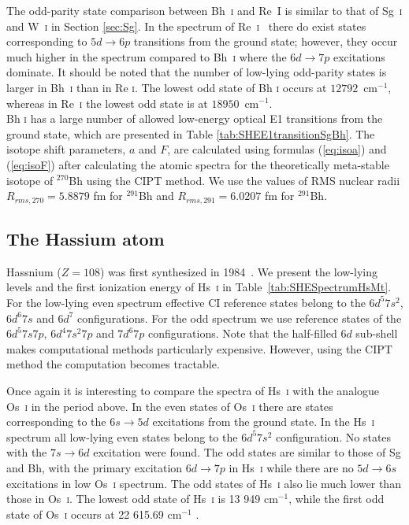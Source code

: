 \documentclass[8pt,a4paper, twoside]{report}
\begin{document}
 The odd-parity state comparison between Bh~\textsc{i} and Re~\textsc{I} is similar to that of Sg~\textsc{i} and W~\textsc{i} in Section \ref{sec:Sg}. In the spectrum of Re~\textsc{i}~\cite{NIST_ASD} there do exist states corresponding to  $5d \rightarrow 6p$ transitions from the ground state; however, they occur much higher in the spectrum compared to Bh~\textsc{i} where the $6d \rightarrow 7p$ excitations dominate. It should be noted that the number of low-lying odd-parity states is larger in Bh~\textsc{i} than in Re \textsc{i}. The lowest odd state of Bh \textsc{i} occurs at $12 792$~cm$^{-1}$, whereas in Re~\textsc{i} the lowest odd state is at $18 950$~cm$^{-1}$.\\
 \linebreak
 Bh \textsc{i} has a large number of allowed low-energy optical E1 transitions from the ground state, which are presented  in Table \ref{tab:SHEE1transitionSgBh}. The isotope shift parameters, $a$ and $F$, are calculated using formulas (\ref{eq:isoa}) and (\ref{eq:isoF}) after calculating the atomic spectra for the theoretically meta-stable isotope of $^{270}$Bh using the CIPT method. We use the values of RMS nuclear radii  $ R_{rms,\text{270}} =  5.8879$ fm for $^{291}$Bh and $R_{rms,\text{291}} = 6.0207$ fm  for $^{291}$Bh.
 
\subsection{The Hassium atom} \label{sec:Hs}

Hassnium ($Z=108$) was first synthesized in 1984~\cite{Munzenberg1984}. We present the low-lying levels and the first ionization energy of Hs~\textsc{i} in Table~\ref{tab:SHESpectrumHsMt}. For the low-lying even spectrum effective CI reference states belong to the $6d^5 7s^2$, $6d^6 7s$ and $6d^7$ configurations. For the odd spectrum we use reference states of the $6d^5 7s 7p$, $6d^4 7s^2 7p$ and $7d^6 7p$ configurations.  Note that the half-filled $6d$ sub-shell makes computational methods particularly expensive. However, using the CIPT method the computation becomes tractable.  

Once again it is interesting to compare the spectra of Hs~\textsc{i} with the analogue Os~\textsc{i} in the period above. In the even states of Os~\textsc{i} there are states corresponding to the $6s \rightarrow 5d$ excitations from the ground state. In the Hs~\textsc{i} spectrum all low-lying even states belong to the  $6d^5 7s^2$ configuration. No states with the $7s \rightarrow 6d$ excitation were found. The odd states are similar to those of Sg and Bh, with the primary excitation $6d \rightarrow 7p$ in Hs~\textsc{i} while there are no  $5d \rightarrow 6s$ excitations in low Os~\textsc{i} spectrum. The odd states of Hs~\textsc{i} also lie much lower than those in Os~\textsc{i}.  The lowest odd state of Hs~\textsc{i} is 13 949 cm$^{-1}$, while the first odd state of Os~\textsc{i} occurs at 22 615.69 cm$^{-1}$ \cite{NIST_ASD}. 
\end{document}
